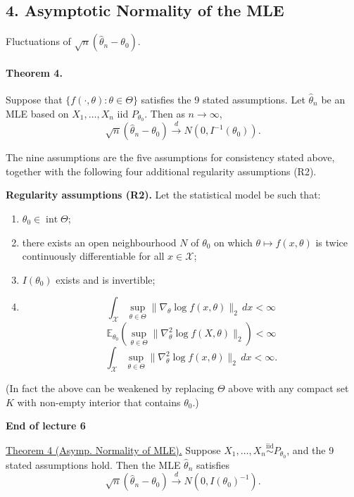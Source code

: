 \documentclass[11pt,a4paper]{article}
\begin{document}
\subsection*{4. Asymptotic Normality of the MLE}
Fluctuations of $\sqrt{n}(\hat{\theta}_n-\theta_0)$.

\paragraph{Theorem 4.}
Suppose that $\{f(\cdot,\theta):\theta\in\Theta\}$ satisfies the 9 stated
assumptions. Let $\hat{\theta}_n$ be an MLE based on $X_1,\ldots,X_n$
iid $P_{\theta_0}$. Then as $n\to\infty$,
\[
\sqrt{n}(\hat{\theta}_n-\theta_0)\xrightarrow{d}
N(0,I^{-1}(\theta_0)).
\]

The nine assumptions are the five assumptions for consistency stated above,
together with the following four additional regularity assumptions (R2).

\medskip\noindent\textbf{Regularity assumptions (R2).} Let the statistical model be such that:
\begin{enumerate}
\item[(1)] $\theta_0\in\operatorname{int}\Theta$;
\item[(2)] there exists an open neighbourhood $N$ of $\theta_0$ on which
$\theta\mapsto f(x,\theta)$ is twice continuously differentiable for all $x\in\mathcal{X}$;
\item[(3)] $I(\theta_0)$ exists and is invertible;
\item[(4)]
\[
\int_{\mathcal{X}}\sup_{\theta\in\Theta}
\|\nabla_\theta\log f(x,\theta)\|_2\,dx<\infty
\]
\[
\mathbb{E}_{\theta_0}\left(\sup_{\theta\in\Theta}
\|\nabla_\theta^2\log f(X,\theta)\|_2\right)<\infty
\]
\[
\int_{\mathcal{X}}\sup_{\theta\in\Theta}
\|\nabla_\theta^2\log f(x,\theta)\|_2\,dx<\infty.
\]
\end{enumerate}
(In fact the above can be weakened by replacing $\Theta$ above with any compact set $K$ with
non-empty interior that contains $\theta_0$.)

\begin{center}
\textbf{End of lecture 6}
\end{center}

\noindent\underline{Theorem 4 (Asymp. Normality of MLE).}\quad
Suppose $X_1,\ldots,X_n\overset{\mathrm{iid}}{\sim}P_{\theta_0}$, and the 9 stated
assumptions hold. Then the MLE $\hat{\theta}_n$ satisfies
\[
\sqrt{n}(\hat{\theta}_n-\theta_0)\xrightarrow{d}
N(0,I(\theta_0)^{-1}).
\]
\end{document}
